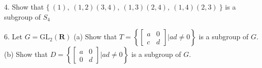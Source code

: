 \begin{mdframed}[style=darkAnswer,frametitle={Joe Starr}]
  \begin{itemize}[align=left]
  \end{itemize}
\end{mdframed}
\newpage
\begin{mdframed}[style=darkQuesion]
  4. Show that $\{\ (1),\ (1,2)(3,4),\ (1,3)(2,4),\ (1,4)(2,3)\ \}$ is a subgroup 
  of $S_{4}$
\end{mdframed}

\begin{mdframed}[style=darkAnswer,frametitle={Joe Starr}]
  \begin{itemize}[align=left]
    \Invs{
      
    }
    \Clos{
      
    }
  \end{itemize}
\end{mdframed}
\newpage
\begin{mdframed}[style=darkQuesion]
  6. Let $G=\mathrm{GL}_{2}(\mathbf{R})$
  (a) Show that $T=\left\{\left[\begin{array}{ll}a & 0 \\ c & d\end{array}\right] | a d \neq 0\right\}$ is a subgroup of $G .$
  (b) Show that $D=\left\{\left[\begin{array}{ll}a & 0 \\ 0 & d\end{array}\right] | a d \neq 0\right\}$ is a subgroup of $G .$
    
\end{mdframed}

